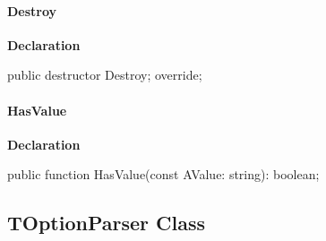 \documentclass{report}
\newif\ifpdf
\begin{document}
\paragraph*{Destroy}\hspace*{\fill}

\label{PasDoc_OptionParser.TSetOption-Destroy}
\begin{list}{}{
\setlength{\itemindent}{0cm}
\setlength{\listparindent}{0cm}
\setlength{\leftmargin}{\evensidemargin}
\addtolength{\leftmargin}{\tmplength}
\settowidth{\labelsep}{X}
\addtolength{\leftmargin}{\labelsep}
\setlength{\labelwidth}{\tmplength}
}
\item[\textbf{Declaration}\hfill]
\ifpdf
\begin{flushleft}
\fi
\begin{ttfamily}
public destructor Destroy; override;\end{ttfamily}

\ifpdf
\end{flushleft}
\fi

\end{list}
\paragraph*{HasValue}\hspace*{\fill}

\label{PasDoc_OptionParser.TSetOption-HasValue}
\begin{list}{}{
\setlength{\itemindent}{0cm}
\setlength{\listparindent}{0cm}
\setlength{\leftmargin}{\evensidemargin}
\addtolength{\leftmargin}{\tmplength}
\settowidth{\labelsep}{X}
\addtolength{\leftmargin}{\labelsep}
\setlength{\labelwidth}{\tmplength}
}
\item[\textbf{Declaration}\hfill]
\ifpdf
\begin{flushleft}
\fi
\begin{ttfamily}
public function HasValue(const AValue: string): boolean;\end{ttfamily}

\ifpdf
\end{flushleft}
\fi

\end{list}
\ifpdf
\subsection*{\large{\textbf{TOptionParser Class}}\normalsize\hspace{1ex}\hrulefill}
\else
\end{document}
